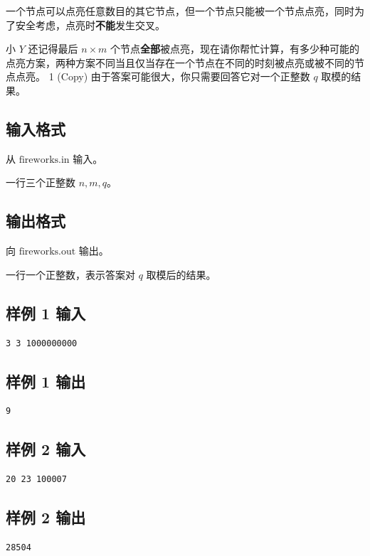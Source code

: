 \documentclass[12pt,a4paper,oneside]{ctexart}
\begin{document}
一个节点可以点亮任意数目的其它节点，但一个节点只能被一个节点点亮，同时为了安全考虑，点亮时\textbf{不能}发生交叉。

小 ${Y}$ 还记得最后 $n \times m$ 个节点\textbf{全部}被点亮，现在请你帮忙计算，有多少种可能的点亮方案，两种方案不同当且仅当存在一个节点在不同的时刻被点亮或被不同的节点点亮。
1 (Copy)
由于答案可能很大，你只需要回答它对一个正整数 $q$ 取模的结果。

  \subsection*{输入格式}
  
从 $\text{fireworks.in}$ 输入。

    一行三个正整数 $n,m,q$。

  \subsection*{输出格式}
  
向 $\text{fireworks.out}$ 输出。

  一行一个正整数，表示答案对 $q$ 取模后的结果。

  \subsection*{样例 1 输入}
  \begin{verbatim}
3 3 1000000000
\end{verbatim}
  \subsection*{样例 1 输出}
  \begin{verbatim}
9
\end{verbatim}
  \subsection*{样例 2 输入}
  \begin{verbatim}
20 23 100007 
\end{verbatim}
  \subsection*{样例 2 输出}
  \begin{verbatim}
28504
\end{verbatim}
\end{document}
